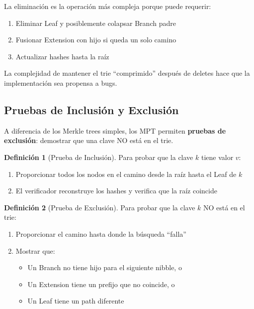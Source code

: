 \documentclass[11pt,a4paper,twoside,openright]{book}
\theoremstyle{definition}
\newtheorem{definition}{Definición}[chapter]
\theoremstyle{plain}
\theoremstyle{remark}
\begin{document}
\begin{advertencia}
La eliminación es la operación más compleja porque puede requerir:
\begin{enumerate}
    \item Eliminar Leaf y posiblemente colapsar Branch padre
    \item Fusionar Extension con hijo si queda un solo camino
    \item Actualizar hashes hasta la raíz
\end{enumerate}

La complejidad de mantener el trie ``comprimido'' después de deletes hace que la implementación sea propensa a bugs.
\end{advertencia}

\subsection{Pruebas de Inclusión y Exclusión}

\begin{keyidea}
A diferencia de los Merkle trees simples, los MPT permiten \textbf{pruebas de exclusión}: demostrar que una clave NO está en el trie.
\end{keyidea}

\begin{definition}[Prueba de Inclusión]
Para probar que la clave $k$ tiene valor $v$:
\begin{enumerate}
    \item Proporcionar todos los nodos en el camino desde la raíz hasta el Leaf de $k$
    \item El verificador reconstruye los hashes y verifica que la raíz coincide
\end{enumerate}
\end{definition}

\begin{definition}[Prueba de Exclusión]
Para probar que la clave $k$ NO está en el trie:
\begin{enumerate}
    \item Proporcionar el camino hasta donde la búsqueda ``falla''
    \item Mostrar que:
    \begin{itemize}
        \item Un Branch no tiene hijo para el siguiente nibble, o
        \item Un Extension tiene un prefijo que no coincide, o
        \item Un Leaf tiene un path diferente
    \end{itemize}
\end{enumerate}
\end{definition}
\end{document}
